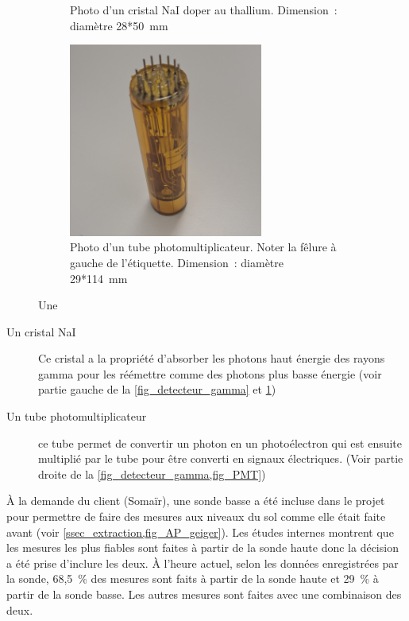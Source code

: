 \begin{figure}
\begin{subfigure}[t]{0.5\textwidth}
        \caption[Photo d'un cristal NaI]{Photo d'un cristal NaI doper au thallium. Dimension~: diamètre 28*50~mm}
        \label{fig_Nai}
    \end{subfigure}
    \begin{subfigure}[t]{0.5\textwidth}
        \centering
        \includegraphics[width=0.7\textwidth]{img/photo/PMT.jpg}
        
        \caption[Photo d'un tube photomultiplicateur]{Photo d'un tube photomultiplicateur. Noter la fêlure à gauche de l'étiquette. Dimension~: diamètre 29*114~mm}
        \label{fig_PMT}
    \end{subfigure}
    \caption{Une }

\end{figure}
\begin{description}
    \item[Un cristal NaI] Ce cristal a la propriété d'absorber les photons haut énergie des rayons gamma pour les réémettre comme des photons plus basse énergie (voir partie gauche de la \cref{fig_detecteur_gamma} et \cref{fig_Nai})~\cite{site:explication_NaI}
    \item[Un tube photomultiplicateur]ce tube permet de convertir un photon en un photoélectron qui est ensuite multiplié par le tube pour être converti en signaux électriques. (Voir partie droite de la \cref{fig_detecteur_gamma,fig_PMT})~\cite{site:explication_NaI}
\end{description}
À la demande du client (Somaïr), une sonde basse a été incluse dans le projet pour permettre de faire des mesures aux niveaux du sol comme elle était faite avant (voir \cref{ssec_extraction,fig_AP_geiger}). %
Les études internes montrent que les mesures les plus fiables sont faites à partir de la sonde haute donc la décision a été prise d'inclure les deux. À l'heure actuel, selon les données enregistrées par la sonde, 68,5~\% des mesures sont faits à partir de la sonde haute et 29~\% à partir de la sonde basse. Les autres mesures sont faites avec une combinaison des deux.

